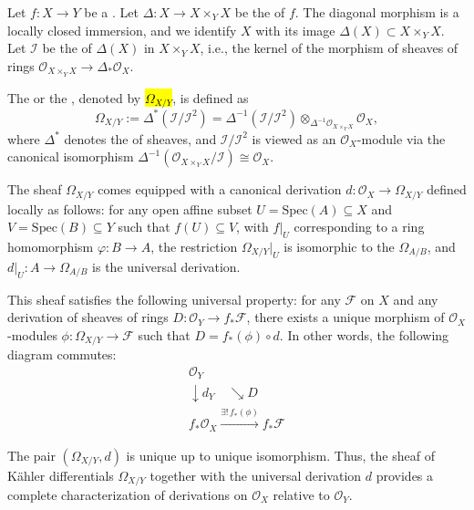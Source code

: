 \begin{definition} \label{definition:sheaf_of_kahler_differentials_of_a_morphism_of_schemes}
    Let $f: X \to Y$ be a . Let $\Delta: X \to X \times_Y X$ be the  of $f$. The diagonal morphism is a locally closed immersion, and we identify $X$ with its image $\Delta(X) \subset X \times_Y X$. Let $\mathcal{I}$ be the  of $\Delta(X)$ in $X \times_Y X$, i.e., the kernel of the morphism of sheaves of rings $\mathcal{O}_{X \times_Y X} \to \Delta_*\mathcal{O}_X$.

    The  or the , denoted by \hl{$\Omega_{X/Y}$}, is defined as
    $$\Omega_{X/Y} := \Delta^*(\mathcal{I}/\mathcal{I}^2) = \Delta^{-1}(\mathcal{I}/\mathcal{I}^2) \otimes_{\Delta^{-1}\mathcal{O}_{X \times_Y X}} \mathcal{O}_X,$$
    where $\Delta^*$ denotes the  of sheaves, and $\mathcal{I}/\mathcal{I}^2$ is viewed as an $\mathcal{O}_X$-module via the canonical isomorphism $\Delta^{-1}(\mathcal{O}_{X \times_Y X}/\mathcal{I}) \cong \mathcal{O}_X$.

    The sheaf $\Omega_{X/Y}$ comes equipped with a canonical derivation $d: \mathcal{O}_X \to \Omega_{X/Y}$ defined locally as follows: for any open affine subset $U = \mathrm{Spec}(A) \subseteq X$ and $V = \mathrm{Spec}(B) \subseteq Y$ such that $f(U) \subseteq V$, with $f|_U$ corresponding to a ring homomorphism $\varphi: B \to A$, the restriction $\Omega_{X/Y}|_U$ is isomorphic to the  $\Omega_{A/B}$, and $d|_U: A \to \Omega_{A/B}$ is the universal derivation.

    This sheaf satisfies the following universal property: for any  $\mathcal{F}$ on $X$ and any derivation of sheaves of rings $D: \mathcal{O}_Y \to f_*\mathcal{F}$, there exists a unique morphism of $\mathcal{O}_X$-modules $\phi: \Omega_{X/Y} \to \mathcal{F}$ such that $D = f_*(\phi) \circ d$. In other words, the following diagram commutes:
    $$
    \begin{array}{c}
    \mathcal{O}_Y \\
    \downarrow{\scriptstyle d_Y} \quad \searrow{\scriptstyle D} \\
    f_*\mathcal{O}_X \xrightarrow{\exists! \, f_*(\phi)} f_*\mathcal{F}
    \end{array}
    $$

    The pair $(\Omega_{X/Y}, d)$ is unique up to unique isomorphism. Thus, the sheaf of Kähler differentials $\Omega_{X/Y}$ together with the universal derivation $d$ provides a complete characterization of derivations on $\mathcal{O}_X$ relative to $\mathcal{O}_Y$.
\end{definition}
